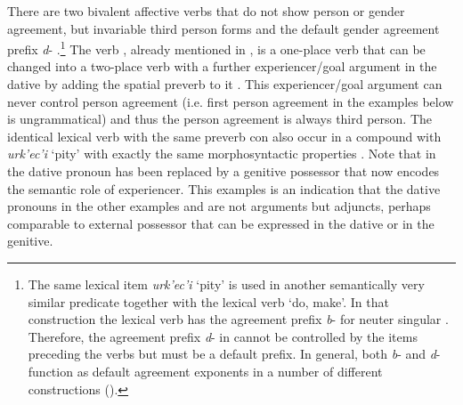 There are two bivalent affective verbs that do not show person or gender agreement, but invariable third person forms and the default gender agreement prefix \textit{d}- .\footnote{The same lexical item \textit{urk'ec'i} `pity' is used in another semantically very similar predicate together with the lexical verb `do, make'. In that construction the lexical verb has the agreement prefix \textit{b}- for neuter singular . Therefore, the agreement prefix \textit{d}- in  cannot be controlled by the items preceding the verbs but must be a default prefix. In general, both \textit{b}- and \textit{d}- function as default agreement exponents in a number of different constructions ().} The verb  , already mentioned in , is a one-place verb that can be changed into a two-place verb with a further experiencer/goal argument in the dative by adding the spatial preverb  to it . This experiencer/goal argument can never control person agreement (i.e. first person agreement in the examples below is ungrammatical) and thus the person agreement is always third person. The identical lexical verb with the same preverb con also occur in a compound with \textit{urk'ec'i} `pity' with exactly the same morphosyntactic properties . Note that in  the dative pronoun has been replaced by a genitive possessor that now encodes the semantic role of experiencer. This examples is an indication that the dative pronouns in the other examples  and  are not arguments but adjuncts, perhaps comparable to external possessor that can be expressed in the dative or in the genitive. 
%


